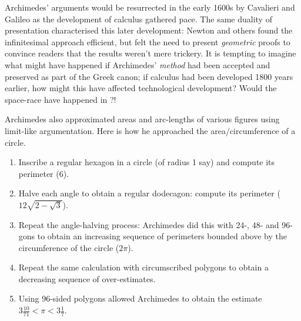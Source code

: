Archimedes' arguments would be resurrected in the early 1600s by Cavalieri and Galileo as the development of calculus gathered pace. The same duality of presentation characterised this later development: Newton and others found the infinitesimal approach efficient, but felt the need to present \emph{geometric} proofs to convince readers that the results weren't mere trickery.\smallbreak
It is tempting to imagine what might have happened if Archimedes' \emph{method} had been accepted and preserved as part of the Greek canon; if calculus had been developed 1800 years earlier, how might this have affected technological development? Would the space-race have happened in ?! %


 Archimedes also approximated areas and arc-lengths of various figures using limit-like argumentation. Here is how he approached the area/circumference of a circle.\label{pg:archquadcircle}

\begin{enumerate}\itemsep0pt
  \item Inscribe a regular hexagon in a circle (of radius 1 say) and compute its perimeter ($6$).
  \item Halve each angle to obtain a regular dodecagon: compute its perimeter ($12\sqrt{2-\sqrt 3}$).
  \item Repeat the angle-halving process: Archimedes did this with 24-, 48- and 96-gons to obtain an increasing sequence of perimeters bounded above by the circumference of the circle ($2\pi$).
  \item Repeat the same calculation with circumscribed polygons to obtain a decreasing sequence of over-estimates.
  \item Using 96-sided polygons allowed Archimedes to obtain the estimate $3\frac{10}{71}<\pi<3\frac 17$.
\end{enumerate}

